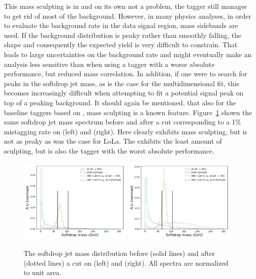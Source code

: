 This mass sculpting is in and on its own not a problem, the tagger still manages to get rid of most of the background. However, in many physics analyses, in order to evaluate the background rate in the data signal region, mass sidebands are used. If the background distribution is peaky rather than smoothly falling, the shape and consequently the expected yield is very difficult to constrain. That leads to large uncertainties on the background rate and might eventually make an analysis less sensitive than when using a tagger with a worse absolute performance, but reduced mass correlation. In addition, if one were to search for peaks in the softdrop jet mass, as is the case for the multidimensional fit, this becomes increasingly difficult when attempting to fit a potential signal peak on top of a peaking background.\newline
It should again be mentioned, that also for the baseline taggers based on \nsubj, mass sculpting is a known feature. Figure~\ref{fig:lola:masssculpttau} shown the same softdrop jet mass spectrum before and after a cut corresponding to a 1\% mistagging rate on \nsubj (left) and \ddt (right). Here \nsubj clearly exhibits mass sculpting, but is not as peaky as was the case for LoLa. The \ddt exhibits the least amount of sculpting, but is also the tagger with the worst absolute performance.\par 
\begin{figure}[h!]
\centering
\includegraphics[width=0.49\textwidth]{figures/vtagging/lola/wLola_v6_500rew-mass-afterCut-ddt_normed.png}
\includegraphics[width=0.49\textwidth]{figures/vtagging/lola/wLola_v6_500rew-mass-afterCut-jtau21_normed.png}
\caption{The softdrop jet mass distribution before (solid lines) and after (dotted lines) a cut on \nsubj (left) and \ddt (right). All spectra are normalized to unit area.}
\label{fig:lola:masssculpttau}
\end{figure}
